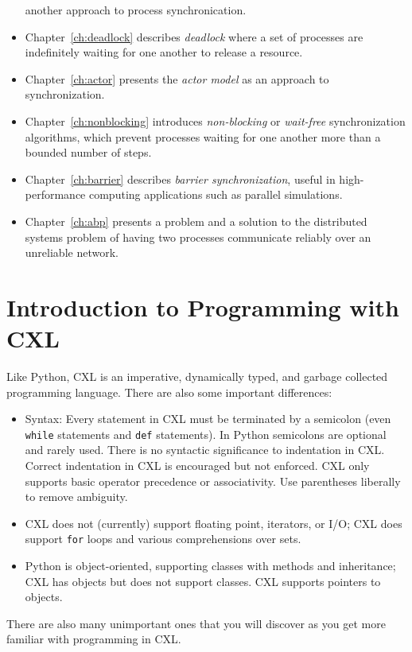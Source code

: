 \documentclass{report}
\begin{document}
\begin{itemize}
another approach to process synchronication.
\item Chapter~\ref{ch:deadlock} describes \emph{deadlock}
where a set of processes are indefinitely waiting for one another to
release a resource.
\item Chapter~\ref{ch:actor} presents the \emph{actor model} as an approach to
synchronization.
\item Chapter~\ref{ch:nonblocking} introduces \emph{non-blocking} or
\emph{wait-free} synchronization algorithms,
which prevent processes waiting for one another more than a bounded number of
steps.
\item Chapter~\ref{ch:barrier} describes \emph{barrier synchronization},
useful in high-performance computing applications such as parallel simulations.
\item Chapter~\ref{ch:abp} presents a problem and a solution to the distributed
systems problem of having two processes communicate reliably over an unreliable
network.
\end{itemize}

\chapter{Introduction to Programming with CXL}
\label{ch:cxlintro}

Like Python, CXL is an imperative,
dynamically typed, and garbage collected programming language.
There are also some important differences:
\begin{itemize}
\item Syntax: Every statement in CXL must be terminated by a semicolon
(even \texttt{while} statements and \texttt{def} statements).
In Python semicolons are optional and rarely used.
There is no syntactic significance to indentation in CXL.
Correct indentation in CXL is encouraged but not enforced.
CXL only supports basic operator precedence or associativity.
Use parentheses liberally to remove ambiguity.
\item CXL does not (currently) support floating point, iterators, or I/O;
CXL does support \texttt{for} loops and various comprehensions over sets.
\item Python is object-oriented, supporting classes with methods and
inheritance; CXL has objects but does not support classes.  CXL supports
pointers to objects.
\end{itemize}
There are also many unimportant ones that you will discover as
you get more familiar with programming in CXL.
\end{document}
